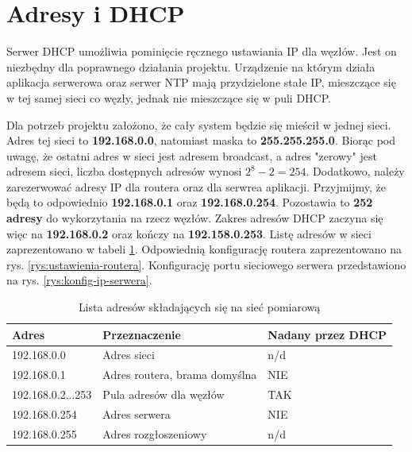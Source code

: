 \documentclass[12pt,oneside,a4paper]{book}
\theoremstyle{break}
\begin{document}
\section{Adresy i DHCP}
Serwer DHCP umożliwia pominięcie ręcznego ustawiania IP dla węzłów. Jest on niezbędny 
dla poprawnego działania projektu. Urządzenie na którym działa aplikacja serwerowa oraz
serwer NTP mają przydzielone stałe IP, mieszczące się w tej samej sieci co węzły, jednak 
nie mieszczące się w puli DHCP.
\par Dla potrzeb projektu założono, że cały system będzie się mieścił w jednej sieci.
Adres tej sieci to \textbf{192.168.0.0}, natomiast maska to \textbf{255.255.255.0}.
Biorąc pod uwagę, że ostatni adres w sieci jest adresem broadcast, a adres "zerowy"
jest adresem sieci, liczba dostępnych adresów wynosi $2^8-2=254$. Dodatkowo, należy
zarezerwować adresy IP dla routera oraz dla serwrea aplikacji. Przyjmijmy, 
że będą to odpowiednio \textbf{192.168.0.1} oraz \textbf{192.168.0.254}. 
Pozostawia to \textbf{252 adresy} do wykorzytania na rzecz węzłów. 
Zakres adresów DHCP zaczyna się więc na \textbf{192.168.0.2} oraz
kończy na \textbf{192.158.0.253}. Listę adresów w sieci zaprezentowano 
w tabeli \ref{tab:addresses}. Odpowiednią konfigurację routera 
zaprezentowano na rys. \ref{rys:ustawienia-routera}. Konfigurację 
portu sieciowego serwera przedstawiono na rys. \ref{rys:konfig-ip-serwera}.

\begin{table}[ht]
    \centering
    \begin{tabular}{|l | l | l|}
    Adres & Przeznaczenie & Nadany przez DHCP \\
    \hline
    192.168.0.0 & Adres sieci & n/d \\
    192.168.0.1 & Adres routera, brama domyślna & NIE \\
    192.168.0.2...253 & Pula adresów dla węzłów & TAK \\
    192.168.0.254 & Adres serwera & NIE \\
    192.168.0.255 & Adres rozgłoszeniowy & n/d
    \end{tabular}
    \caption{Lista adresów składających się na sieć pomiarową}
    \label{tab:addresses}
\end{table}
\end{document}
